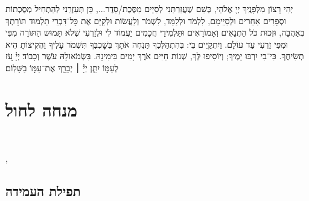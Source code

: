 \documentclass[twoside, openany, parskip=half, 11pt]{book}
\begin{document}
יְהִי רָצוֹן מִלְּפָנֶֽיךָ יְיָ אֱלֹהֵי, כְּשֵׁם שֶׁעֲזַרֽתַּנִי לְסַיֵים מַסֶּכֶת/סֵדֶר..., כֵּן תְּעַזְרֵֽנִי לְהַתְחִיל מְסֶכְתוֹת וּסְפָרִים אַחֵרים וּלְסַיֵימָם, לִלְמֹד וּלְלַמֵּד, לִשְׁמֹר וְלַעֲשׂוֹת וּלְקַיֵּם אֶת כׇּל־דִּבְרֵי תַלְמוּד תּוֹרָתְךָ בְּאַהֲבָה, וּזְכוּת כֹֹּל הַתְנָאִים וְאָמוֹרָאִים וּתַּלְמִידֵי חֲכָמִים יַעֲמוֹד לִי וּלְזַרְעִי שֶׁלֹא תָּמוּש הַתּוֹרָה מִפִּי וּמִפִּי זַרְעִי עַד עוֹלָם. וַיִתְקַיֵים בִּי: בְּהִתְהַלֶּכְךָ תַּנְחֶה אֹתָךְ בְּשׇׁכְבְּךָ תִּשְׁמֹר עָלֶיךָ וַהֲקִיצוֹתָ הִיא תְשִׂיחֶךָ. כִּי־בִי יִרְבּוּ יָמֶיךָ; וְיוֹסִיפוּ לְּךָ, שְׁנוֹת חַיִּים אֹרֶךְ יָמִים בִּימִינָהּ. בִּשְׂמֹאולָהּ עֹשֶׁר וְכָבוֹד׃
יְיָ֗ עֹ֭ז לְעַמּ֣וֹ יִתֵּ֑ן יְיָ֓ ׀ יְבָרֵ֖ךְ אֶת־עַמּ֣וֹ בַשָּׁלֽוֹם׃

\kaddishitchadeta

\chapter[מנחה לחול]{ מנחה לחול }
\\
\ashrei

\halfkaddish

,

\section[תפילת העמידה]{ תפילת העמידה }


\amidaopening{\ayt}{}

\weekdaysakedusha \vspace{0.5\baselineskip}

\sepline

\weekdaysabinah

\weekdaysateshuva

\weekdaysaselichah

\weekdaysageulah

\weekdaysaanneinu

\weekdaysarefuah

\weekdaysaberacha

\weekdaysashofar

\weekdaysamishpat

\weekdaysaminim

\weekdaysatzadikim
\end{document}
